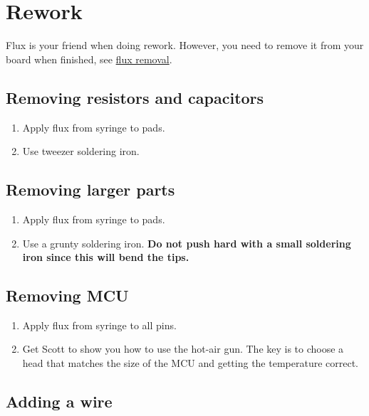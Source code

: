 \chapter{Rework}

Flux is your friend when doing rework.  However, you need to remove it
from your board when finished, see \hyperref[flux removal]{flux
  removal}.


\section{Removing resistors and capacitors}

\begin{enumerate}
\item Apply flux from syringe to pads.

\item Use tweezer soldering iron.
\end{enumerate}


\section{Removing larger parts}


\begin{enumerate}
\item Apply flux from syringe to pads.

\item Use a grunty soldering iron.  \textbf{Do not push hard with a
  small soldering iron since this will bend the tips.}
\end{enumerate}



\section{Removing MCU}

\begin{enumerate}
\item Apply flux from syringe to all pins.

\item Get Scott to show you how to use the hot-air gun.  The key is to
  choose a head that matches the size of the MCU and getting the
  temperature correct.
\end{enumerate}



\section{Adding a wire}

